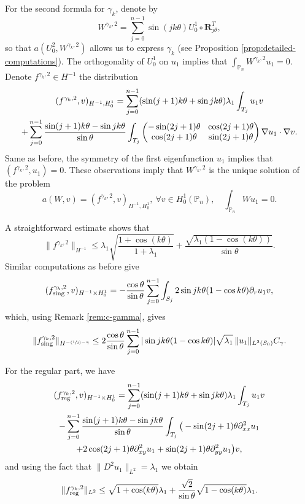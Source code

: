 \documentclass[JEP,XML,SOM,Unicode,ThmDefs,NoFloatCountersInSection,published]{cedram}
\newcommand{\Psfrac}[2]{(\sfrac{#1}{#2})}
\newcommand{\colsep}{\arraycolsep4.5pt}
\theoremstyle{plain}
\theoremstyle{definition}
\newcommand{\bo}[1]{{\boldsymbol#1}}
\newcommand{\reg}{\textup{reg}}
\newcommand{\sing}{\textup{sing}}
\def\Pp{{\mathbb{P}_n}}
\newcommand{\lb}{\lambda}
\begin{document}
For the second formula for $\gamma_k$, denote by
\[
W^{\gamma_k,2} = \sum_{j=0}^{n-1} \sin(jk\theta) U_0^1\circ \bo R_{j\theta}^T,
\]
so that $a(U_0^2,W^{\gamma_k,2})$ allows us to express $\gamma_k$ (see Proposition \ref{prop:detailed-computations}). The orthogonality of $U_0^1$ on $u_1$ implies that $\int_\Pp W^{\gamma_k,2}u_1=0$. Denote $f^{\gamma_k,2} \in H^{-1}$ the distribution
\vspace*{-5pt}
\begin{multline*}
(f^{\gamma_k,2},v)_{H^{-1},H_0^1}
= \sum_{j=0}^{n-1} (\sin(j+1)k\theta+\sin jk\theta) \lambda_1\int_{T_j} u_1 v\\\colsep
+ \sum_{j=0}^{n-1} \frac{\sin(j+1)k\theta-\sin jk\theta}{\sin \theta} \int_{T_j}\begin{pmatrix}
-\sin (2j+1)\theta & \cos (2j+1) \theta \\
\cos(2j+1)\theta & \sin (2j+1)\theta
\end{pmatrix}\nabla u_1 \cdot \nabla v.
\end{multline*}
Same as before, the symmetry of the first eigenfunction $u_1$ implies that $(f^{\gamma_k,2},u_1) = 0$. These observations imply that $W^{\gamma_k,2}$ is the unique solution of the problem
\[
a(W,v) = (f^{\gamma_k,2},v)_{H^{-1},H_0^1},\ \forall v \in H_0^1(\Pp),\quad \int_\Pp Wu_1=0.
\]

A straightforward estimate shows that
\[
\|f^{\gamma_k,2}\|_{H^{-1}} \leq \lambda_1 \sqrt{\frac{1+\cos(k\theta)}{1+\lambda_1}} +\frac{\sqrt{\lambda_1(1-\cos(k\theta))}}{\sin \theta}.
\]
Similar computations as before give
\[
(f_{\sing}^{\gamma_k,2}, v)_{H^{-1}\times H^1_0} = - \frac{\cos \theta}{\sin \theta} \sum_{j=0}^{n-1}\int_{S_j} 2 \sin jk\theta(1-\cos k \theta) \partial_r u_1 v,
\]
which, using Remark \ref{rem:c-gamma}, gives
\[
\|f_{\sing}^{\gamma_k,2}\|_{H^{-\Psfrac 12-\gamma}}\le 2\frac{\cos \theta}{\sin \theta}\sum_{j=0}^{n-1} | \sin jk\theta(1-\cos k \theta)| \sqrt{\lb_1}\,\|u_1\|_{L^2(S_0)} C_\gamma.
\]

For the regular part, we have
\vspace*{-5pt}
\begin{multline*}
(f_{\reg}^{\gamma_k,2}, v)_{H^{-1}\times H^1_0}= \sum_{j=0}^{n-1} (\sin (j+1)k\theta+\sin jk\theta) \lb_1 \int_{T_j} u_1v \\
- \sum_{j=0}^{n-1} \frac{\sin(j+1)k\theta-\sin jk\theta}{\sin \theta} \int_{T_j} \big (-\sin (2j+1)\theta \partial^2_{xx}u_1\\
+2 \cos (2j+1)\theta \partial^2_{xy} u_1+ \sin(2j+1)\theta \partial^2_{yy} u_1\big)v,
\end{multline*}
and using the fact that $\|D^2 u_1\|_{L^2} = \lambda_1$ we obtain
\[
\|f_{\reg}^{\gamma_k,2}\|_{L^2}\le \sqrt{1+\cos (k \theta)} \lb_1 +\frac{\sqrt{2}}{\sin \theta} \sqrt{1- \cos (k \theta)}\lb_1 .
\]
\end{document}
